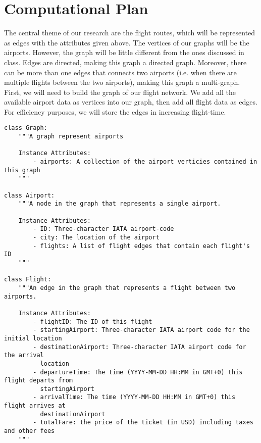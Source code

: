 \documentclass[11pt]{article}
\begin{document}
\section*{Computational Plan}

\quad The central theme of our research are the flight routes, which will be represented as edges with the attributes given above. The vertices of our graphs will be the airports. However, the graph will be little different from the ones discussed in class. Edges are directed, making this graph a directed graph. Moreover, there can be more than one edges that connects two airports (i.e. when there are multiple flights between the two airports), making this graph a multi-graph. \\

\quad First, we will need to build the graph of our flight network. We add all the available airport data as vertices into our graph, then add all flight data as edges. For efficiency purposes, we will store the edges in increasing flight-time.

\begin{Verbatim}[frame=single]
class Graph:
    """A graph represent airports
    
    Instance Attributes:
        - airports: A collection of the airport verticies contained in this graph
    """

class Airport:
    """A node in the graph that represents a single airport. 

    Instance Attributes:
        - ID: Three-character IATA airport-code
        - city: The location of the airport
        - flights: A list of flight edges that contain each flight's ID
    """
    
class Flight:
    """An edge in the graph that represents a flight between two airports. 
    
    Instance Attributes:
        - flightID: The ID of this flight
        - startingAirport: Three-character IATA airport code for the initial location
        - destinationAirport: Three-character IATA airport code for the arrival
          location
        - departureTime: The time (YYYY-MM-DD HH:MM in GMT+0) this flight departs from 
          startingAirport
        - arrivalTime: The time (YYYY-MM-DD HH:MM in GMT+0) this flight arrives at 
          destinationAirport
        - totalFare: the price of the ticket (in USD) including taxes and other fees
    """
\end{Verbatim}
\end{document}
